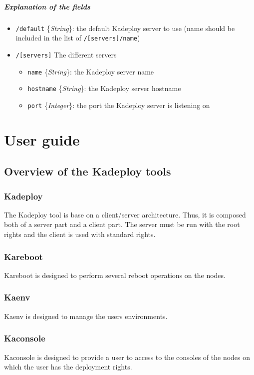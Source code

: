 \documentclass[a4wide,10pt,oneside]{book}
\newcommand{\ypath}[1]{\texttt{#1}}
\newcommand{\yfield}[2]{\texttt{#1} {\small\{{\emph{#2}}\}}:}
\begin{document}
\paragraph{Explanation of the fields\\}
\begin{itemize}
  \item \yfield{\ypath{/default}}{String} the default Kadeploy server to use (name should be included in the list of \ypath{/[servers]/name})
  \item \ypath{/[servers]} The different servers
  \begin{itemize}
    \item \yfield{name}{String} the Kadeploy server name
    \item \yfield{hostname}{String} the Kadeploy server hostname
    \item \yfield{port}{Integer} the port the Kadeploy server is listening on
  \end{itemize}
\end{itemize}

\chapter{User guide}

\section{Overview of the Kadeploy tools}
\subsection{Kadeploy}
The Kadeploy tool is base on a client/server architecture. Thus, it is composed both of a server part and a client part. The server must be run with the root rights and the client is used with standard rights.

\subsection{Kareboot}
Kareboot is designed to perform several reboot operations on the nodes.

\subsection{Kaenv}
Kaenv is designed to manage the users environments.

\subsection{Kaconsole}
Kaconsole is designed to provide a user to access to the consoles of the nodes on which the user has the deployment rights.
\end{document}

